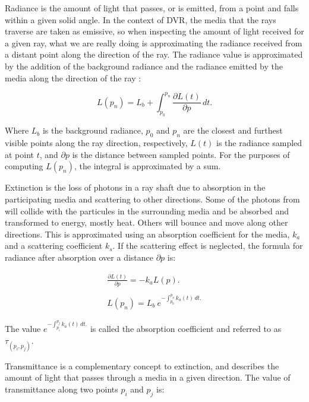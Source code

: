 \documentclass[oneside,a4paper,english,links]{amca}
\begin{document}
Radiance is the amount of light that passes, or is emitted, from a
point and falls within a given solid angle. In the context of DVR, the
media that the rays traverse are taken as emissive, so when inspecting
the amount of light received for a given ray, what we are really doing
is approximating the radiance received from a distant point along the
direction of the ray. The radiance value is approximated by the
addition of the background radiance and the radiance emitted by the
media along the direction of the ray \citep{Kratz2006} : 

\begin{equation} \label{eq:general_radiance}  
  L(p_n) = L_b + \int_{p_0}^{p_n} \frac{\partial L(t)}{\partial p} \, dt.
\end{equation}

Where $L_b$ is the background radiance, $p_0$ and $p_n$ are the
closest and furthest visible points along the ray direction,
respectively, $L(t)$ is the radiance sampled at point $t$, and
$\partial p$ is the distance between sampled points. For the purposes
of computing $L(p_n)$, the integral is approximated by a sum.

Extinction is the loss of photons in a ray shaft due to absorption in
the participating media and scattering to other directions. Some of
the photons from  will collide with the particules in the
surrounding media and be absorbed and transformed to energy, mostly
heat. Others will bounce and move along other directions. This is
approximated using an absorption coefficient for the media, $k_a$ and
a scattering coefficient $k_s$. If the scattering effect is neglected,
the formula for radiance after absorption over a distance $\partial p$
is:

\begin{equation} \label{eq:absorption_radiance}  
  \begin{aligned}
    \frac{\partial L(t)}{\partial p} = -k_a L(p). 
    \\
    \\
    L(p_n) = L_b \ e^{-\int_{p_0}^{p_n} k_a(t) \, dt.}
  \end{aligned}
\end{equation}

The value $e^{-\int_{p_i}^{p_j} k_a(t) \, dt.}$ is called the
absorption coefficient and referred to as $\tau_{(p_i, p_j)}$.

Transmittance is a complementary concept to extinction, and describes
the amount of light that passes through a media in a given
direction. The value of transmittance along two points $p_i$ and $p_j$
is:
\end{document}

